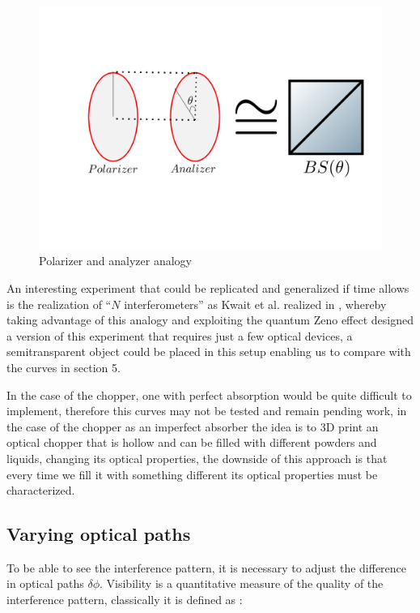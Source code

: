 \documentclass[12pt]{book}
\begin{document}
\begin{figure}[H]
\centering
\includegraphics[width=\linewidth]{images/polarizeranalogy.png}
\caption{Polarizer and analyzer analogy}
\label{BS and polarizer}
\end{figure}

An interesting experiment that could be replicated and generalized if time allows is the realization of ``$N$ interferometers'' as Kwait et al. realized in \cite{exp}, whereby taking advantage of this analogy and exploiting the quantum Zeno effect \cite{zeno} designed a version of this experiment that requires just a few optical devices, a semitransparent object could be placed in this setup enabling us to compare with the curves in section 5.


In the case of the chopper, one with perfect absorption would be quite difficult to implement, therefore this curves may not be tested and remain pending work, in the case of the chopper as an imperfect absorber the idea is to 3D print an optical chopper that is hollow and can be filled with different powders and liquids, changing its optical properties, the downside of this approach is that every time we fill it with something different its optical properties must be characterized.



\subsection{Varying optical paths}

To be able to see the interference pattern, it is necessary to adjust the difference in optical paths $\delta \phi$. Visibility is a quantitative measure of the quality of the interference pattern, classically it is defined as \cite{hecht}:
\end{document}
